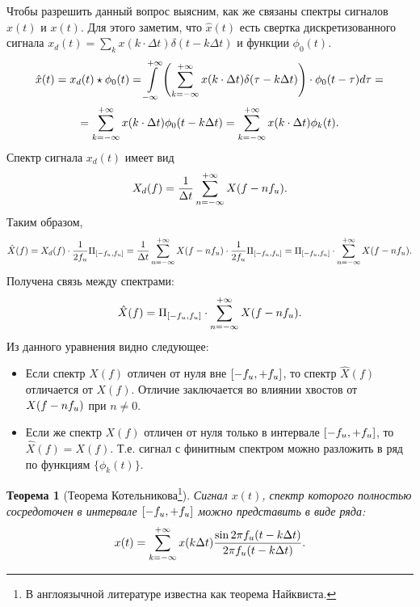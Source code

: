 \documentclass{book}
\newtheorem{theorem}{Теорема}
\numberwithin{theorem}{chapter}
\numberwithin{statement}{chapter}
\numberwithin{lemma}{chapter}
\theoremstyle{definition}
\numberwithin{task}{chapter}
\theoremstyle{remark}
\numberwithin{example}{chapter}
\theoremstyle{definition}
\numberwithin{definition}{chapter}
\theoremstyle{remark}
\theoremstyle{remark}
\numberwithin{lyrics}{section}
\begin{document}
Чтобы разрешить данный вопрос выясним, как же связаны спектры сигналов $\hat{x}(t)$ и $x(t)$. 
Для этого заметим, что $\hat{x}(t)$ есть свертка дискретизованного сигнала $x_d(t) = \sum_k x(k \cdot \Delta t) \delta (t - k \Delta t)$ и функции $\phi_0(t)$.
\begin{gather}
\hat{x}(t) = x_{d}(t) \star \phi_0(t) = \int\limits_{-\infty}^{+\infty} \left(\sum\limits_{k=-\infty}^{+\infty} x(k \cdot \Delta t) \delta(\tau - k \Delta t)\right) \cdot \phi_0(t - \tau) d\tau  = \\ = \sum\limits_{k=-\infty}^{+\infty} x(k \cdot \Delta t) \phi_0(t - k\Delta t) = \sum\limits_{k=-\infty}^{+\infty} x(k \cdot \Delta t) \phi_k(t).
\end{gather}
Спектр сигнала $x_d(t)$ имеет вид
\begin{equation}
X_d(f) = \frac{1}{\Delta t} \sum\limits_{n=-\infty}^{+\infty} X(f - n f_{u}).
\end{equation}
Таким образом,
\begin{equation}
\hat{X}(f) = X_d(f) \cdot \frac{1}{2f_{u}} \Pi_{[-f_{u}, f_{u}]} = \frac{1}{\Delta t} \sum\limits_{n=-\infty}^{+\infty} X(f - n f_{u}) \cdot \frac{1}{2f_{u}} \Pi_{[-f_{u}, f_{u}]} = \Pi_{[-f_{u}, f_{u}]} \cdot \sum\limits_{n=-\infty}^{+\infty} X(f - n f_{u}). 
\end{equation}
Получена связь между спектрами:
\begin{equation}
\hat{X}(f) = \Pi_{[-f_{u}, f_{u}]} \cdot \sum\limits_{n=-\infty}^{+\infty} X(f - n f_{u}).
\end{equation}
Из данного уравнения видно следующее:
\begin{itemize}
\item Если спектр $X(f)$ отличен от нуля вне $[-f_{u}, +f_{u}]$, то спектр $\hat{X}(f)$ отличается от $X(f)$. Отличие заключается во влиянии хвостов от $X(f - nf_{u})$ при $n \neq 0$.
\item Если же спектр $X(f)$ отличен от нуля только в интервале $[-f_{u}, +f_{u}]$, то $\hat{X}(f) = X(f)$. Т.е. сигнал с финитным спектром можно разложить в ряд по функциям $\{\phi_k(t)\}$.
\end{itemize}

\begin{theorem}[Теорема Котельникова\footnote{В англоязычной литературе известна как теорема Найквиста.}]
Сигнал $x(t)$, спектр которого полностью сосредоточен в интервале $[-f_{u},+f_{u}]$ можно представить в виде ряда:
$$
x(t) = \sum\limits_{k=-\infty}^{+\infty} x(k\Delta t) \frac{\sin 2\pi f_{u} (t - k \Delta t)}{2\pi f_{u} (t - k \Delta t)}.
$$
\end{theorem}
\end{document}
